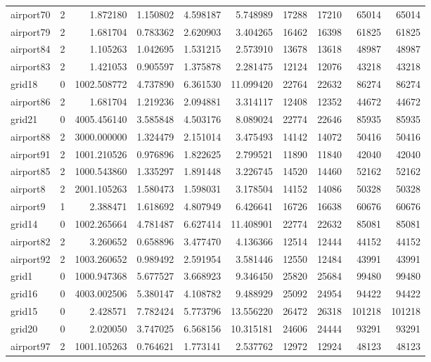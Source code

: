 \begin{longtable}{|l|r|r|r|r|r|r|r|r|r|}
airport70 & 2 & 1.872180 & 1.150802 & 4.598187 & 5.748989 & 17288 & 17210 & 65014 & 65014 \\
airport79 & 2 & 1.681704 & 0.783362 & 2.620903 & 3.404265 & 16462 & 16398 & 61825 & 61825 \\
airport84 & 2 & 1.105263 & 1.042695 & 1.531215 & 2.573910 & 13678 & 13618 & 48987 & 48987 \\
airport83 & 2 & 1.421053 & 0.905597 & 1.375878 & 2.281475 & 12124 & 12076 & 43218 & 43218 \\
grid18 & 0 & 1002.508772 & 4.737890 & 6.361530 & 11.099420 & 22764 & 22632 & 86274 & 86274 \\
airport86 & 2 & 1.681704 & 1.219236 & 2.094881 & 3.314117 & 12408 & 12352 & 44672 & 44672 \\
grid21 & 0 & 4005.456140 & 3.585848 & 4.503176 & 8.089024 & 22774 & 22646 & 85935 & 85935 \\
airport88 & 2 & 3000.000000 & 1.324479 & 2.151014 & 3.475493 & 14142 & 14072 & 50416 & 50416 \\
airport91 & 2 & 1001.210526 & 0.976896 & 1.822625 & 2.799521 & 11890 & 11840 & 42040 & 42040 \\
airport85 & 2 & 1000.543860 & 1.335297 & 1.891448 & 3.226745 & 14520 & 14460 & 52162 & 52162 \\
airport8 & 2 & 2001.105263 & 1.580473 & 1.598031 & 3.178504 & 14152 & 14086 & 50328 & 50328 \\
airport9 & 1 & 2.388471 & 1.618692 & 4.807949 & 6.426641 & 16726 & 16638 & 60676 & 60676 \\
grid14 & 0 & 1002.265664 & 4.781487 & 6.627414 & 11.408901 & 22774 & 22632 & 85081 & 85081 \\
airport82 & 2 & 3.260652 & 0.658896 & 3.477470 & 4.136366 & 12514 & 12444 & 44152 & 44152 \\
airport92 & 2 & 1003.260652 & 0.989492 & 2.591954 & 3.581446 & 12550 & 12484 & 43991 & 43991 \\
grid1 & 0 & 1000.947368 & 5.677527 & 3.668923 & 9.346450 & 25820 & 25684 & 99480 & 99480 \\
grid16 & 0 & 4003.002506 & 5.380147 & 4.108782 & 9.488929 & 25092 & 24954 & 94422 & 94422 \\
grid15 & 0 & 2.428571 & 7.782424 & 5.773796 & 13.556220 & 26472 & 26318 & 101218 & 101218 \\
grid20 & 0 & 2.020050 & 3.747025 & 6.568156 & 10.315181 & 24606 & 24444 & 93291 & 93291 \\
airport97 & 2 & 1001.105263 & 0.764621 & 1.773141 & 2.537762 & 12972 & 12924 & 48123 & 48123 \\

\end{longtable}
